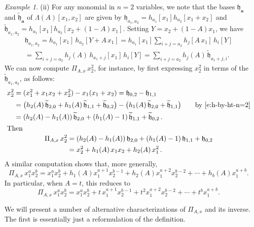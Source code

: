 \documentclass[12pt]{amsart}
\theoremstyle{definition}
\theoremstyle{remark}
\newtheorem{example}[thm]{Example}
\newcommand{\aA}{{\mathbf a}}
\newcommand{\fh}{{\mathfrak h}}
\newcommand{\tfh}{{\widetilde{\mathfrak h}}}
\begin{document}
\begin{example}
(ii) For any monomial in $n=2$ variables, we note that the bases
$\fh_\aA$ and $\tfh_\aA$ of $\Lambda(A)[x_1,x_2]$ are given by
$\fh_{a_1, a_2} = h_{a_1}[x_1]h_{a_2}[x_1+x_2]$ and $\tfh_{a_1, a_2} =
h_{a_1}[x_1]h_{a_2}[x_2+(1-A)x_1]$.  Setting $Y = x_{2}+(1-A)x_{1}$,
we have
\begin{multline}\label{e:h-by-ht-n=2}
\fh _{a_{1},a_{2}} = h_{a_1}[x_1]\, h_{a_2}[Y+A\, x_{1}] =
h_{a_1}[x_1]\sum _{i+j=a_{2}} h_{j}[A \, x_{1}]\, h_{i}[Y] \\
= \sum _{i+j=a_{2}} h_{j}(A) \, h_{a_{1}+j}[x_{1}]\, h_{i}[Y] = \sum
_{i+j=a_{2}} h_{j}(A)\, \tfh _{a_{1}+j, i}.
\end{multline}
We can now compute $\Pi_{A,x}\, x_2^2$, for instance, by first
expressing $x_{2}^{2}$ in terms of the $\tfh _{a_{1},a_{2}}$, as
follows:
\begin{gather}\label{e:expand-x22}
\begin{aligned}
x_2^2 & = (x_1^2+x_1x_2 + x_2^2) - x_1 (x_1+x_2)= \fh_{0,2} -\fh_{1,1} \\
& = \big(h_2(A)\, \tfh_{2,0} + h_1(A)\, \tfh_{1,1} + \tfh_{0,2}\big)
-\big(h_1(A)\, \tfh_{2,0} + \tfh_{1,1}\big) \qquad
\text{by \eqref{e:h-by-ht-n=2}}\\
& = (h_2(A)-h_1(A)) \, \tfh_{2,0} + (h_1(A)-1)\, \tfh_{1,1}+
\tfh_{0,2}\, .
\end{aligned}\\
\intertext{Then}
\label{e:compute-PiA-xee}
\begin{aligned}
\Pi_{A,x}\, x_2^2 & = (h_2(A)-h_1(A)) \, \fh_{2,0} + (h_1(A)-1)\,
\fh_{1,1}+ \fh_{0,2}\\
& = x_2^2 + h_1(A)\, x_1 x_2 + h_2(A)\, x_1^2 \,.
\end{aligned}
\end{gather}
A similar computation shows that, more generally,
\begin{equation}
\label{e nspleth n2}
\Pi_{A, x}\, x_1^a x_2^b = x_1^a x_2^b + h_{1}(A) x_1^{a+1}x_2^{b-1} +
h_{2}(A) x_1^{a+2}x_2^{b-2} + \cdots + h_{b}(A) x_1^{a+b}.
\end{equation}
In particular, when $A = t$, this reduces to
\begin{equation}\label{e nspleth n2 t}
\Pi_{A, x}\, x_1^a x_2^b = x_1^a x_2^b + t \, x_1^{a+1}x_2^{b-1} + t^2
x_1^{a+2}x_2^{b-2} + \cdots + t^b x_1^{a+b}.
\end{equation}
\end{example}

We will present a number of alternative characterizations of $\Pi
_{A,x}$ and its inverse.  The first is essentially just a
reformulation of the definition.
\end{document}
